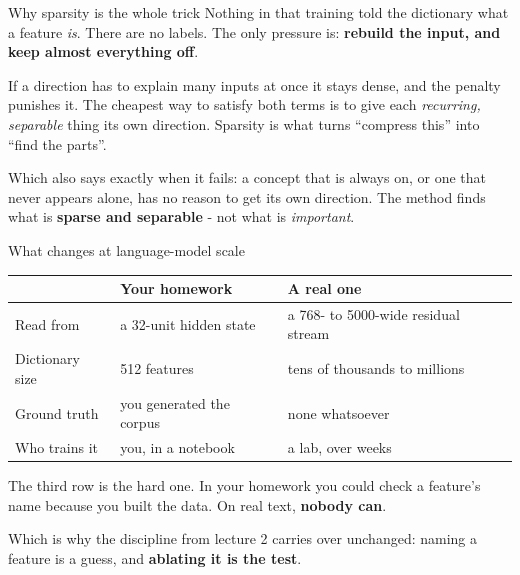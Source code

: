 \documentclass[aspectratio=169]{beamer}
\newcommand{\keybox}[1]{%
  \begin{tcolorbox}[colback=armblue!8, colframe=armblue, boxrule=0.6pt, arc=2pt]
  #1
  \end{tcolorbox}}
\newcommand{\takebox}[1]{%
  \begin{tcolorbox}[colback=paramgreen!8, colframe=paramgreen, boxrule=0.6pt, arc=2pt]
  #1
  \end{tcolorbox}}
\newcommand{\watchbox}[1]{%
  \begin{tcolorbox}[colback=armorange!12, colframe=armorange, boxrule=0.6pt, arc=2pt]
  #1
  \end{tcolorbox}}
\begin{document}
\begin{frame}{Why sparsity is the whole trick}
  \vspace{0.6em}
  Nothing in that training told the dictionary what a feature \emph{is}. There are no labels. The
  only pressure is: \textbf{rebuild the input, and keep almost everything off}.

  \vspace{0.9em}
  \keybox{If a direction has to explain many inputs at once it stays dense, and the penalty
  punishes it. The cheapest way to satisfy both terms is to give each \emph{recurring, separable}
  thing its own direction. Sparsity is what turns ``compress this'' into ``find the parts''.}

  \vspace{0.9em}
  \watchbox{Which also says exactly when it fails: a concept that is always on, or one that never
  appears alone, has no reason to get its own direction. The method finds what is
  \textbf{sparse and separable} - not what is \emph{important}.}
\end{frame}

\begin{frame}{What changes at language-model scale}
  \vspace{0.6em}
  \begin{center}
  \small
  \begin{tabular}{@{}lll@{}}
    \toprule
    & \textbf{Your homework} & \textbf{A real one}\\
    \midrule
    Read from & a 32-unit hidden state & a 768- to 5000-wide residual stream\\[0.4em]
    Dictionary size & 512 features & tens of thousands to millions\\[0.4em]
    Ground truth & you generated the corpus & none whatsoever\\[0.4em]
    Who trains it & you, in a notebook & a lab, over weeks\\
    \bottomrule
  \end{tabular}
  \end{center}

  \vspace{0.8em}
  The third row is the hard one. In your homework you could check a feature's name because you
  built the data. On real text, \textbf{nobody can}.

  \vspace{0.8em}
  \takebox{Which is why the discipline from lecture 2 carries over unchanged: naming a feature is
  a guess, and \textbf{ablating it is the test}.}
\end{frame}
\end{document}
